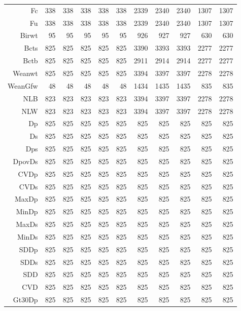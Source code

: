 \begin{table}[p]
\begin{tabular}{rrrrrrrrrrr}
  Fc & 338 & 338 & 338 & 338 & 338 & 2339 & 2340 & 2340 & 1307 & 1307 \\ 
  Fu & 338 & 338 & 338 & 338 & 338 & 2339 & 2340 & 2340 & 1307 & 1307 \\ 
  Birwt &  95 &  95 &  95 &  95 &  95 & 926 & 927 & 927 & 630 & 630 \\ 
  Bcts & 825 & 825 & 825 & 825 & 825 & 3390 & 3393 & 3393 & 2277 & 2277 \\ 
  Bctb & 825 & 825 & 825 & 825 & 825 & 2911 & 2914 & 2914 & 2277 & 2277 \\ 
  Weanwt & 825 & 825 & 825 & 825 & 825 & 3394 & 3397 & 3397 & 2278 & 2278 \\ 
  WeanGfw &  48 &  48 &  48 &  48 &  48 & 1434 & 1435 & 1435 & 835 & 835 \\ 
  NLB & 823 & 823 & 823 & 823 & 823 & 3394 & 3397 & 3397 & 2278 & 2278 \\ 
  NLW & 823 & 823 & 823 & 823 & 823 & 3394 & 3397 & 3397 & 2278 & 2278 \\ 
  Dp & 825 & 825 & 825 & 825 & 825 & 825 & 825 & 825 & 825 & 825 \\ 
  Ds & 825 & 825 & 825 & 825 & 825 & 825 & 825 & 825 & 825 & 825 \\ 
  Dps & 825 & 825 & 825 & 825 & 825 & 825 & 825 & 825 & 825 & 825 \\ 
  DpovDs & 825 & 825 & 825 & 825 & 825 & 825 & 825 & 825 & 825 & 825 \\ 
  CVDp & 825 & 825 & 825 & 825 & 825 & 825 & 825 & 825 & 825 & 825 \\ 
  CVDs & 825 & 825 & 825 & 825 & 825 & 825 & 825 & 825 & 825 & 825 \\ 
  MaxDp & 825 & 825 & 825 & 825 & 825 & 825 & 825 & 825 & 825 & 825 \\ 
  MinDp & 825 & 825 & 825 & 825 & 825 & 825 & 825 & 825 & 825 & 825 \\ 
  MaxDs & 825 & 825 & 825 & 825 & 825 & 825 & 825 & 825 & 825 & 825 \\ 
  MinDs & 825 & 825 & 825 & 825 & 825 & 825 & 825 & 825 & 825 & 825 \\ 
  SDDp & 825 & 825 & 825 & 825 & 825 & 825 & 825 & 825 & 825 & 825 \\ 
  SDDs & 825 & 825 & 825 & 825 & 825 & 825 & 825 & 825 & 825 & 825 \\ 
  SDD & 825 & 825 & 825 & 825 & 825 & 825 & 825 & 825 & 825 & 825 \\ 
  CVD & 825 & 825 & 825 & 825 & 825 & 825 & 825 & 825 & 825 & 825 \\ 
  Gt30Dp & 825 & 825 & 825 & 825 & 825 & 825 & 825 & 825 & 825 & 825 \\ 

\end{tabular}
\end{table}
